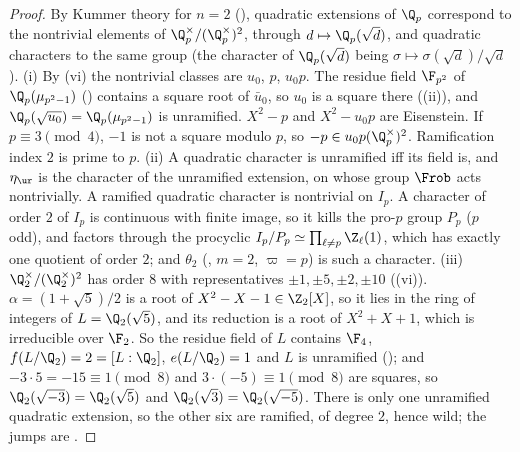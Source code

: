 \begin{proof}
By Kummer theory for $n=2$ (), quadratic extensions of $\Q_p$ correspond to the nontrivial elements of $\Q_p^\times/(\Q_p^\times)^2$, through
$d\mapsto\Q_p(\sqrt d)$, and quadratic characters to the same group (the character of $\Q_p(\sqrt d)$ being $\sigma\mapsto\sigma(\sqrt d)/\sqrt d$). (i) By
(vi) the nontrivial classes are $u_0$, $p$, $u_0p$. The residue field $\F_{p^2}$ of $\Q_p(\mu_{p^2-1})$ () contains a
square root of $\bar u_0$, so $u_0$ is a square there ((ii)), and $\Q_p(\sqrt{u_0})=\Q_p(\mu_{p^2-1})$ is unramified. $X^2-p$ and $X^2-u_0p$ are
Eisenstein. If $p\equiv3\pmod4$, $-1$ is not a square modulo $p$, so $-p\in u_0p(\Q_p^\times)^2$. Ramification index $2$ is prime to $p$. (ii) A quadratic
character is unramified iff its field is, and $\eta_{\ur}$ is the character of the unramified extension, on whose group $\Frob$ acts nontrivially.
A ramified quadratic character is nontrivial on $I_p$. A character of order $2$ of $I_p$ is continuous with finite image, so it kills the pro-$p$ group
$P_p$ ($p$ odd), and factors through the procyclic $I_p/P_p\simeq\prod_{\ell\ne p}\Z_\ell(1)$, which has exactly one quotient of order $2$; and
$\theta_2$ (, $m=2$, $\varpi=p$) is such a character. (iii) $\Q_2^\times/(\Q_2^\times)^2$ has order $8$ with representatives $\pm1,\pm5,\pm2,\pm10$
((vi)). $\alpha=(1+\sqrt5)/2$ is a root of $X^2-X-1\in\Z_2[X]$, so it lies in the ring of integers of $L=\Q_2(\sqrt5)$, and its reduction is a root of $X^2+X+1$,
which is irreducible over $\F_2$. So the residue field of $L$ contains $\F_4$, $f(L/\Q_2)=2=[L:\Q_2]$, $e(L/\Q_2)=1$ and $L$ is unramified (); and
$-3\cdot5=-15\equiv1\pmod8$ and $3\cdot(-5)\equiv1\pmod 8$ are squares, so $\Q_2(\sqrt{-3})=\Q_2(\sqrt5)$ and $\Q_2(\sqrt3)=\Q_2(\sqrt{-5})$. There is only one unramified quadratic
extension, so the other six are ramified, of degree $2$, hence wild; the jumps are .
\end{proof}

